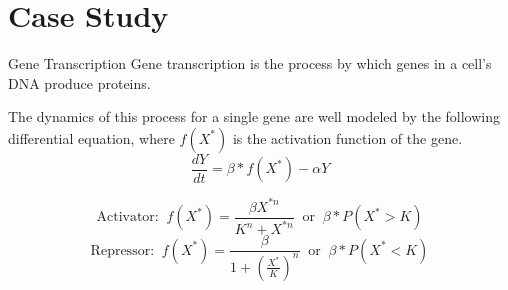 \documentclass{beamer}
\begin{document}
\section{Case Study}

\begin{frame}{Gene Transcription}
    Gene transcription is the process by which genes in a cell’s DNA produce proteins.

    \vspace*{0.125in}
    The dynamics of this process for a single gene are well modeled by the following differential equation, where $f(X^*)$ is the activation function of the gene.
    $$\frac{dY}{dt}=\beta*f(X^*) - \alpha Y$$

    $$\text{Activator: } \ f(X^*)=\frac{\beta X^{*n}}{K^n + X^{*n}} \ \text{ or } \ \beta * P(X^* > K)$$
    $$\text{Repressor: } \ f(X^*)=\frac{\beta}{1 + \left(\frac{X^*}{K}\right)^n} \ \text{ or } \ \beta * P(X^* < K)$$
\end{frame}
\end{document}
